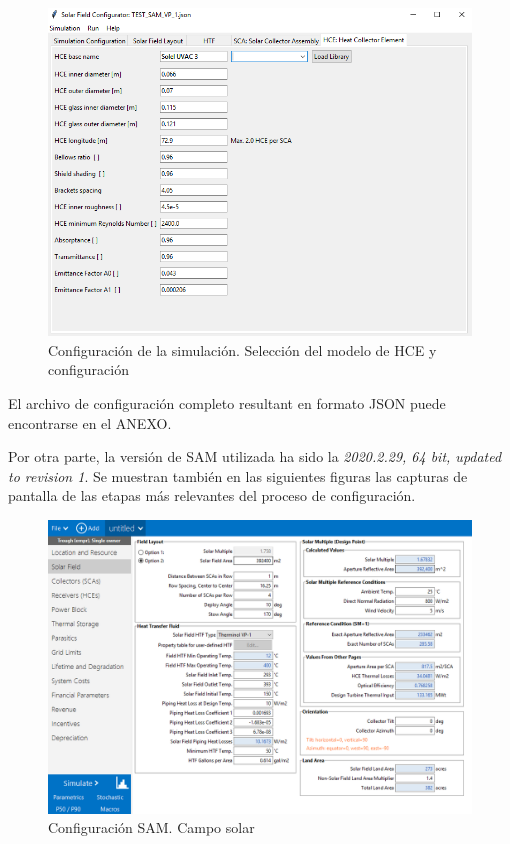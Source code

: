 \documentclass[11pt]{article}
\begin{document}
\begin{figure}
\includegraphics[scale=0.8]{images/interface05.png}
\caption{Configuración de la simulación. Selección del modelo de HCE y configuración} 
\label{fig:interface05}
\end{figure}

El archivo de configuración completo resultant en formato JSON puede
encontrarse en el ANEXO.

Por otra parte, la versión de SAM utilizada ha sido la \emph{2020.2.29,
64 bit, updated to revision 1}. Se muestran también en las siguientes
figuras las capturas de pantalla de las etapas más relevantes del
proceso de configuración.

\begin{figure}
\includegraphics[scale=0.8]{images/captura_sam01.png}
\caption{Configuración SAM. Campo solar} 
\label{fig:captura01}
\end{figure}
\end{document}
